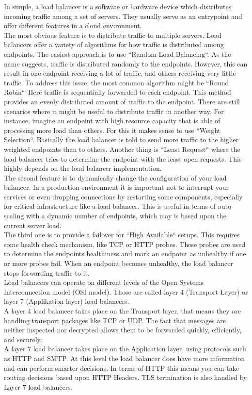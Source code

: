 In simple, a load balancer is a software or hardware device which distributes incoming traffic among a set of servers.
They usually serve as an entrypoint and offer different features in a cloud environment.
\\
The most obvious feature is to distribute traffic to multiple servers.
Load balancers offer a variety of algorithms for how traffic is distributed among endpoints.
The easiest approach is to use ``Random Load Balancing``.
As the name suggests, traffic is distributed randomly to the endpoints.
However, this can result in one endpoint receiving a lot of traffic, and others receiving very little traffic.
To address this issue, the most common algorithm might be ``Round Robin``.
Here traffic is sequentially forwarded to each endpoint.
This method provides an evenly distributed amount of traffic to the endpoint.
There are still scenarios where it might be useful to distribute traffic in another way.
For instance, imagine an endpoint with high resource capacity that is able of processing more load than others.
For this it makes sense to use ``Weight Selection``.
Basically the load balancer is told to send more traffic to the higher weighted endpoints than to others.
Another thing is ``Least Request`` where the load balancer tries to determine the endpoint with the least open requests.
This highly depends on the load balancer implementation.
\\
The second feature is to dynamically change the configuration of your load balancer.
In a production environment it is important not to interrupt your services or even dropping connections by restarting some components, especially for critical infrastructure like a load balancer.
This is useful in terms of auto scaling with a dynamic number of endpoints, which may is based upon the current server load.
\\
The third one is to provide a failover for ``High Available`` setups.
This requires some health check mechanism, like TCP or HTTP probes.
These probes are used to determine the endpoints healthiness and mark an endpoint as unhealthy if one or more probes fail.
When an endpoint becomes unhealthy, the load balancer stops forwarding traffic to it.
\\
Load balancers can operate on different levels of the Open Systems Interconnection model (OSI model).
Those are called layer 4 (Transport Layer) or layer 7 (Applikation layer) load balancers.
\\
A layer 4 load balancer takes place on the Transport layer, that means they are handling transport packages like TCP or UDP.
The fact that messages are neither inspected nor decrypted allows them to be forwarded quickly, efficiently, and securely.
\\
A layer 7 load balancer takes place on the Application layer, using protocols such as HTTP and SMTP.
At this level the load balancer does have more information and can perform smarter decisions.
In terms of HTTP this means you can take routing decisions based upon HTTP Headers.
TLS termination is also handled by Layer 7 load balancers.

